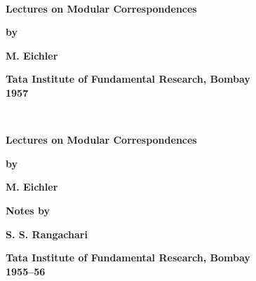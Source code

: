 ~\phantom{a}
\thispagestyle{empty}
\begin{center}
{\Large\bf Lectures on Modular Correspondences}
\vskip 1cm

{\bf  by}
\medskip

{\large\bf  M. Eichler}
\vfill



{\bf  Tata Institute of Fundamental Research, Bombay}\\
{\bf  1957}
\end{center}
\eject


~\phantom{a}
\thispagestyle{empty}
\begin{center}
{\Large\bf Lectures on Modular Correspondences}
\vskip 1cm

{\bf  by}
\medskip

{\large\bf  M. Eichler}
\vfill

{\bf  Notes by}
\medskip

{\large\bf  S. S. Rangachari}
\vfill


{\bf  Tata Institute of Fundamental Research, Bombay}\\
{\bf  1955--56}
\end{center}
\eject
